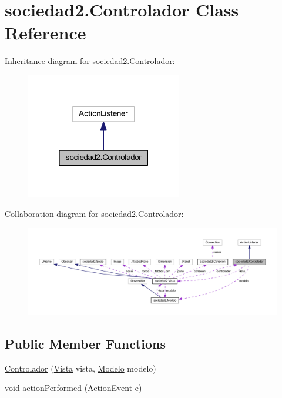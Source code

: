 \hypertarget{classsociedad2_1_1_controlador}{}\section{sociedad2.\+Controlador Class Reference}
\label{classsociedad2_1_1_controlador}


Inheritance diagram for sociedad2.\+Controlador\+:
\nopagebreak
\begin{figure}[H]
\begin{center}
\leavevmode
\includegraphics[width=193pt]{classsociedad2_1_1_controlador__inherit__graph}
\end{center}
\end{figure}


Collaboration diagram for sociedad2.\+Controlador\+:
\nopagebreak
\begin{figure}[H]
\begin{center}
\leavevmode
\includegraphics[width=350pt]{classsociedad2_1_1_controlador__coll__graph}
\end{center}
\end{figure}
\subsection*{Public Member Functions}
\begin{DoxyCompactItemize}
\item 
\mbox{\hyperlink{classsociedad2_1_1_controlador_a7601ad3194e4adbe6f760df3ed36c607}{Controlador}} (\mbox{\hyperlink{classsociedad2_1_1_vista}{Vista}} vista, \mbox{\hyperlink{classsociedad2_1_1_modelo}{Modelo}} modelo)
\item 
void \mbox{\hyperlink{classsociedad2_1_1_controlador_a87860be9c7aff3e6d88d4e88f66e6f51}{action\+Performed}} (Action\+Event e)
\end{DoxyCompactItemize}


